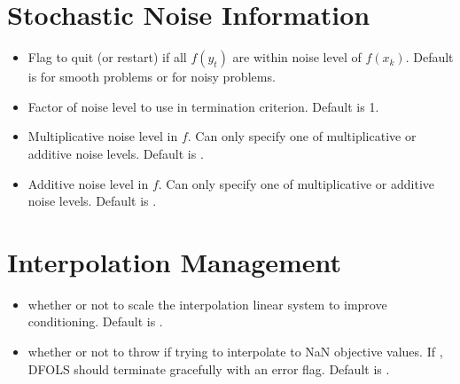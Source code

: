 \documentclass[letterpaper,10pt,english]{sphinxmanual}
\begin{document}
\section{Stochastic Noise Information}
\label{\detokenize{advanced:stochastic-noise-information}}\begin{itemize}
\item {} 
 \sphinxhyphen{} Flag to quit (or restart) if all \(f(y_t)\) are within noise level of \(f(x_k)\). Default is  for smooth problems or  for noisy problems.

\item {} 
 \sphinxhyphen{} Factor of noise level to use in termination criterion. Default is 1.

\item {} 
 \sphinxhyphen{} Multiplicative noise level in \(f\). Can only specify one of multiplicative or additive noise levels. Default is .

\item {} 
 \sphinxhyphen{} Additive noise level in \(f\). Can only specify one of multiplicative or additive noise levels. Default is .

\end{itemize}


\section{Interpolation Management}
\label{\detokenize{advanced:interpolation-management}}\begin{itemize}
\item {} 
 \sphinxhyphen{} whether or not to scale the interpolation linear system to improve conditioning. Default is .

\item {} 
 \sphinxhyphen{} whether or not to throw  if trying to interpolate to NaN objective values. If , DFO\sphinxhyphen{}LS should terminate gracefully with an error flag. Default is .

\end{itemize}
\end{document}

